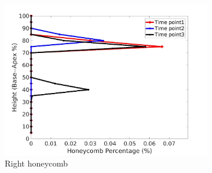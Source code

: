 \begin{figure}[H]
\begin{subfigure}{.42\linewidth}
  \includegraphics[width=\linewidth,trim={{.0\wd0} {.0\wd0} {.0\wd0} {.0\wd0}},clip]{Appendix/Image_AppexA/BaseToApex/IPF6RightLungHoneycombDiseaseAgainstHeight.jpg}
  \caption{Right honeycomb}
  \label{fig:IPF6DiseaseAgainstHeight-f}
\end{subfigure}
\begin{subfigure}{.42\linewidth}%

\end{subfigure}
\end{figure}

